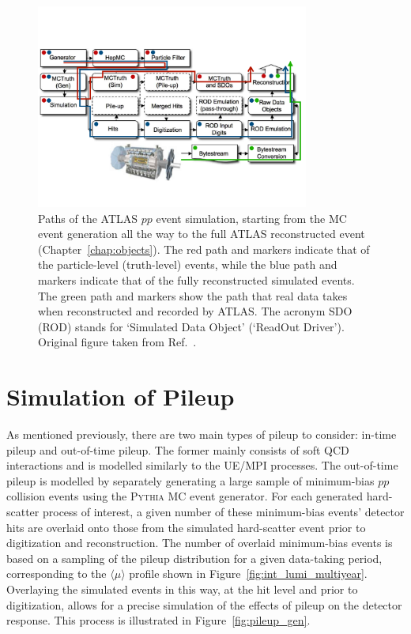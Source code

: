 \begin{figure}[!htb]
    \begin{center}
        \includegraphics[width=0.8\textwidth]{figures/event_simulation/atlas_sim_structure_arrPDF}
        \caption{
            Paths of the ATLAS $pp$ event simulation, starting from the MC event generation all the way
            to the full ATLAS reconstructed event (Chapter~\ref{chap:objects}).
            The red path and markers indicate that of the particle-level (truth-level) events,
            while the blue path and markers indicate that of the fully reconstructed simulated events.
            The green path and markers show the path that real data takes when reconstructed and recorded by ATLAS.
            The acronym SDO (ROD) stands for `Simulated Data Object' (`ReadOut Driver').
            Original figure taken from Ref.~\cite{ATLASSim}.
        }
        \label{fig:atlas_sim_structure}
    \end{center}
\end{figure}

\section{Simulation of Pileup}
\label{sec:pileup_sim}

As mentioned previously, there are two main types of pileup to consider: in-time pileup and out-of-time pileup.
The former mainly consists of soft QCD interactions and is modelled similarly to the UE/MPI processes.
The out-of-time pileup is modelled by separately generating a large sample of minimum-bias $pp$ collision events
using the \textsc{Pythia} MC event generator.
For each generated hard-scatter process of interest, a given number of these minimum-bias events' detector hits
are overlaid onto those from the simulated hard-scatter event prior to digitization and reconstruction.
The number of overlaid minimum-bias events is based on a sampling of the pileup distribution for a given
data-taking period, corresponding to the $\langle \mu \rangle$ profile shown in Figure~\ref{fig:int_lumi_multiyear}.
Overlaying the simulated events in this way, at the hit level and prior to digitization, allows for a precise
simulation of the effects of pileup on the detector response.
This process is illustrated in Figure~\ref{fig:pileup_gen}.

